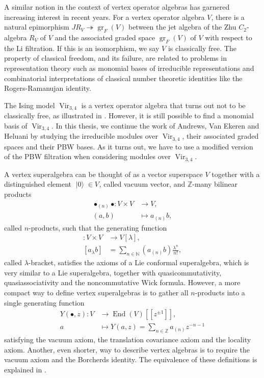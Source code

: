 \documentclass[a4paper, 12pt, reqno]{amsart}
\theoremstyle{remark}
\DeclareMathOperator{\Vir}{Vir}
\DeclareMathOperator{\gr}{gr}
\DeclareMathOperator{\End}{End}
\DeclareMathOperator{\vac}{|0\rangle}
\DeclareMathOperator{\zero}{\overline{0}}
\begin{document}
A similar notion in the context of vertex operator algebras has garnered increasing interest in recent years.
For a vertex operator algebra $V$, there is a natural epimorphism $JR_V \twoheadrightarrow \gr_F(V)$ between the jet algebra of the Zhu $C_2$-algebra $R_V$ of $V$ and the associated graded space $\gr_F(V)$ of $V$ with respect to the Li filtration.
If this is an isomorphism, we say $V$ is classically free.
The property of classical freedom, and its failure, are related to problems in representation theory such as monomial bases of irreducible representations and combinatorial interpretations of classical number theoretic identities like the Rogers-Ramanujan identity.

The Ising model $\Vir_{3, 4}$ is a vertex operator algebra that turns out not to be classically free, as illustrated in \cite{andrews_singular_2022}.
However, it is still possible to find a monomial basis of $\Vir_{3, 4}$.
In this thesis, we continue the work of Andrews, Van Ekeren and Heluani by studying the irreducible modules over $\Vir_{3, 4}$, their associated graded spaces and their PBW bases.
As it turns out, we have to use a modified version of the PBW filtration when considering modules over $\Vir_{3, 4}$.

A vertex superalgebra can be thought of as a vector superspace $V$ together with a distinguished element $\vac \in V_{\zero}$, called vacuum vector, and $\mathbb{Z}$-many bilinear products
\begin{align*}
  \bullet_{(n)}\bullet: V \times V &\to V, \\
  (a, b) &\mapsto a_{(n)}b,
\end{align*}
called $n$-products, such that the generating function
\begin{align*}
  [\bullet_{\lambda}\bullet]: V \times V &\to V[\lambda], \\
  [a_{\lambda}b] &= \sum_{n \in \mathbb{N}}(a_{(n)}b)\frac{\lambda^n}{n!},
\end{align*}
called $\lambda$-bracket, satisfies the axioms of a Lie conformal superalgebra, which is very similar to a Lie superalgebra, together with quasicommutativity, quasiassociativity and the noncommutative Wick formula.
However, a more compact way to define vertex superalgebras is to gather all $n$-products into a single generating function
\begin{align*}
  Y(\bullet, z): V &\to \End(V)[[z^{\pm 1}]], \\
  a &\mapsto Y(a, z) = \sum_{n \in \mathbb{Z}}a_{(n)}z^{-n - 1}
\end{align*}
satisfying the vacuum axiom, the translation covariance axiom and the locality axiom.
Another, even shorter, way to describe vertex algebras is to require the vacuum axiom and the Borcherds identity.
The equivalence of these definitions is explained in \cite[\S1]{de_sole_finite_2006}.
\end{document}
